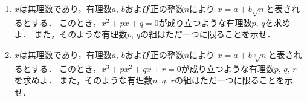 \documentclass[../../main.tex]{subfiles}
\begin{document}
\begin{enumerate}
  \item$x$は無理数であり，有理数$a, \, b$および正の整数$n$により
    $x=a+b\sqrt{n}$と表されるとする．
    このとき，$x^2+px+q=0$が成り立つような有理数$p, \, q$を求めよ．
    また，そのような有理数$p, \, q$の組はただ一つに限ることを示せ．
  \item$x$は無理数であり，有理数$a, \, b$および正の整数$n$により
    $x=a+b\sqrt[3]{n}$と表されるとする．
    このとき，$x^3+px^2+qx+r=0$が成り立つような有理数$p, \, q, \, r$を求めよ．
    また，そのような有理数$p, \, q, \, r$の組はただ一つに限ることを示せ．
\end{enumerate}
\end{document}
